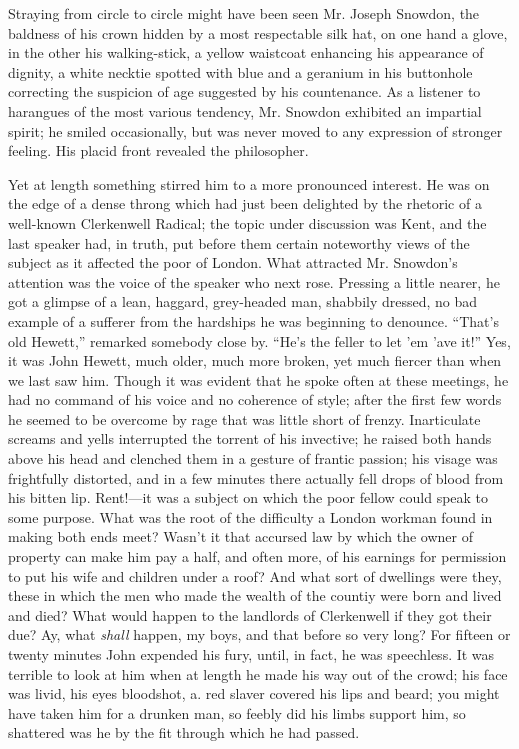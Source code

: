 Straying from circle to circle might have been seen Mr. Joseph Snowdon,
the baldness of his crown hidden by a most respectable silk hat, on one
hand a glove, in the other his walking-stick, a yellow waistcoat
enhancing his appearance of dignity, a white necktie spotted with blue
and a geranium in his buttonhole correcting the suspicion of age
suggested by his countenance. As a listener to harangues of the most
various tendency, Mr. Snowdon exhibited an impartial spirit;
{\protect\hypertarget{151}{}{}}he smiled occasionally, but was never
moved to any expression of stronger feeling. His placid front revealed
the philosopher.

Yet at length something stirred him to a more pronounced interest. He
was on the edge of a dense throng which had just been delighted by the
rhetoric of a well-known Clerkenwell Radical; the topic under discussion
was Kent, and the last speaker had, in truth, put before them certain
noteworthy views of the subject as it affected the poor of London. What
attracted Mr. Snowdon's attention was the voice of the speaker who next
rose. Pressing a little nearer, he got a glimpse of a lean, haggard,
grey-headed man, shabbily dressed, no bad example of a sufferer from the
hardships he was beginning to denounce. ``That's old Hewett,'' remarked
somebody close by. ``He's the feller to let 'em 'ave it!'' Yes, it was
John Hewett, much older, much more broken, yet much fiercer than when we
last saw him. Though it was evident that he spoke often at these
meetings, he had no command of his voice
{\protect\hypertarget{152}{}{}}and no coherence of style; after the
first few words he seemed to be overcome by rage that was little short
of frenzy. Inarticulate screams and yells interrupted the torrent of his
invective; he raised both hands above his head and clenched them in a
gesture of frantic passion; his visage was frightfully distorted, and in
a few minutes there actually fell drops of blood from his bitten lip.
Rent!---it was a subject on which the poor fellow could speak to some
purpose. What was the root of the difficulty a London workman found in
making both ends meet? Wasn't it that accursed law by which the owner of
property can make him pay a half, and often more, of his earnings for
permission to put his wife and children under a roof? And what sort of
dwellings were they, these in which the men who made the wealth of the
countiy were born and lived and died? What would happen to the landlords
of Clerkenwell if they got their due? Ay, what \emph{shall} happen, my
boys, and that before so very long? For fifteen or twenty minutes John
expended his {\protect\hypertarget{153}{}{}}fury, until, in fact, he was
speechless. It was terrible to look at him when at length he made his
way out of the crowd; his face was livid, his eyes bloodshot, a. red
slaver covered his lips and beard; you might have taken him for a
drunken man, so feebly did his limbs support him, so shattered was he by
the fit through which he had passed.

